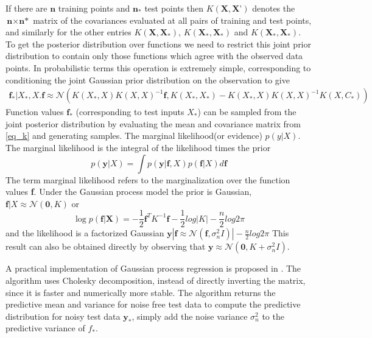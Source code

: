 If there are $\textbf{n}$ training points and $\mathbf{n_*}$ test points then $K(\textbf{X}, \textbf{X'})$ denotes the $\textbf{n} \times \textbf{n*}$ matrix of the covariances evaluated at all pairs of training and test points, and similarly for the other entries $K(\textbf{X}, \mathbf{X_*})$, $K(\mathbf{X_*}, \mathbf{X_*})$ and $K(\mathbf{X_*}, \mathbf{X_*})$. To get the posterior distribution over functions we need to restrict this joint prior distribution to contain only those functions which agree with the observed data points. In probabilistic terms this operation is extremely simple, corresponding to conditioning the joint Gaussian prior distribution on the observation to give
\begin{multline*}
	\label{eq_k}
	\textbf{f}_*|X_*,X. \textbf{f} \approx \mathcal{N} \left( K(X_*, X) K(X, X)^{-1}\textbf{f}, K(X_*, X_*)-K(X_*, X)K(X,X)^{-1}K(X, C_*) \right)
\end{multline*}
Function values $\textbf{f}_*$ (corresponding to test inputs $X_*$) can be sampled from the joint posterior distribution by evaluating the mean and covariance matrix from \eqref{eq_k} and generating samples.
The marginal likelihood(or evidence) $p(y|X)$. The marginal likelihood is the integral of the likelihood times the prior
\begin{equation}
	p(\textbf{y}|X) = \int p(\textbf{y}|\textbf{f}, X)p(\textbf{f}|X)d\textbf{f}
\end{equation}
The term marginal likelihood refers to the marginalization over the function values \textbf{f}. Under the Gaussian process model the prior is Gaussian, $\textbf{f}|X \approx \mathcal{N}(\textbf{0}, K)$ or
\begin{equation}
	\log p(\textbf{f|X}) = -\frac{1}{2} \textbf{f}^TK^{-1}\textbf{f}-\frac{1}{2} log |K| - \frac{n}{2} log 2\pi
\end{equation}
and the likelihood is a factorized Gaussian $\textbf{y}|\textbf{f} \approx \mathcal{N}(\textbf{f}, \sigma^2_nI)| - \frac{n}{2} log2\pi$
This result can also be obtained directly by observing that $\textbf{y} \approx \mathcal{N}(\textbf{0}, K+\sigma^2_nI)$.

A practical implementation of Gaussian process regression is proposed in  \cite{rasmussen2003gaussian}. The algorithm uses Cholesky decomposition, instead of directly inverting the matrix, since it is faster and numerically more stable. The algorithm returns the predictive mean and variance for noise free test data to compute the predictive distribution for noisy test data $\textbf{y}_*$, simply add the noise variance $\sigma^2_n$ to the predictive variance of $f_*$.
